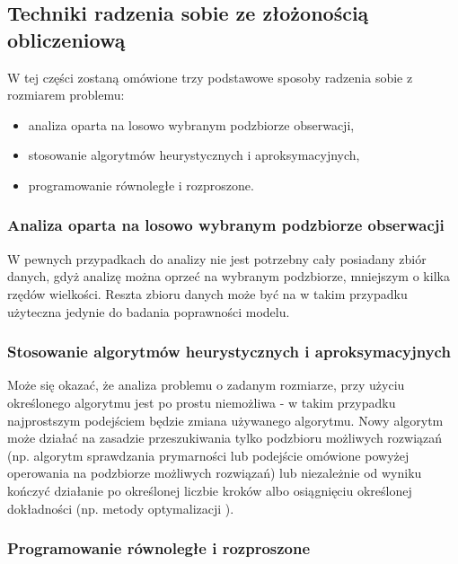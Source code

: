 \documentclass[man,mfu]{mgrwms}
\begin{document}
\subsection{Techniki radzenia sobie ze złożonością obliczeniową}

W tej części zostaną omówione trzy podstawowe sposoby radzenia sobie z rozmiarem problemu:

\begin{itemize}
\item analiza oparta na losowo wybranym podzbiorze obserwacji,
\item stosowanie algorytmów heurystycznych i aproksymacyjnych,
\item programowanie równoległe i rozproszone.
\end{itemize}

\subsubsection{Analiza oparta na losowo wybranym podzbiorze obserwacji}

W pewnych przypadkach do analizy nie jest potrzebny cały posiadany zbiór danych, gdyż analizę można oprzeć na wybranym podzbiorze, mniejszym o kilka rzędów wielkości. Reszta zbioru danych może być na w takim przypadku użyteczna jedynie do badania poprawności modelu. 



\subsubsection{Stosowanie algorytmów heurystycznych i aproksymacyjnych}

Może się okazać, że analiza problemu o zadanym rozmiarze, przy użyciu określonego algorytmu jest po prostu niemożliwa - w takim przypadku najprostszym podejściem będzie zmiana używanego algorytmu. Nowy algorytm może działać na zasadzie przeszukiwania tylko podzbioru możliwych rozwiązań (np. algorytm sprawdzania prymarności \cite{Harel} lub podejście omówione powyżej operowania na podzbiorze możliwych rozwiązań) lub niezależnie od wyniku kończyć działanie po określonej liczbie kroków albo osiągnięciu określonej dokładności (np. metody optymalizacji \cite{LevMarq}).

\subsubsection{Programowanie równoległe i rozproszone}
\end{document}
